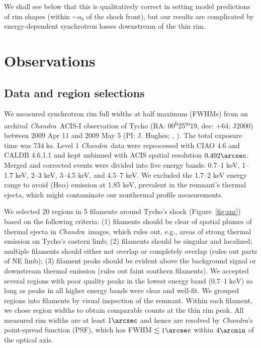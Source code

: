 \documentclass[manuscript]{aastex}  %
\newcommand*{\mt}{\mathrm}
\newcommand*{\unit}[1]{\;\mt{#1}}  %
\newcommand*{\abt}{\mathord{\sim}} %
\newcommand*{\tsup}{\textsuperscript}
\newcommand*{\Chandra}{\textit{Chandra}\ }
\begin{document}
We shall see below that this is qualitatively correct in setting model
predictions of rim shapes (within $\abt a_b$ of the shock front), but our
results are complicated by energy-dependent synchrotron losses downstream of
the thin rim.


\section{Observations}
\label{sec:observations}

\subsection{Data and region selections}
\label{sec:regions}

We measured synchrotron rim full widths at half maximum (FWHMs) from an
archival \Chandra ACIS-I observation of Tycho
(RA: 00\tsup{h}25\tsup{m}19, dec: +64; J2000)
between 2009 Apr 11 and 2009 May 5 (PI: J. Hughes;
,
).
The total exposure time was $734 \unit{ks}$.
Level 1 \Chandra data were reprocessed with CIAO 4.6 and CALDB 4.6.1.1 and kept
unbinned with ACIS spatial resolution $0.492\arcsec$.
Merged and corrected events were divided into five energy bands:
0.7--1 keV, 1--1.7 keV, 2--3 keV, 3--4.5 keV, and 4.5--7 keV.
We excluded the 1.7--2 keV energy range to avoid  (He$\alpha$)
emission at 1.85 keV, prevalent in the remnant's thermal ejecta, which
might contaminate our nonthermal profile measurements.

We selected 20 regions in 5 filaments around Tycho's shock
(Figure~\ref{fig:snr}) based on the following criteria: (1) filaments should be
clear of spatial plumes of thermal ejecta in \Chandra images, which rules out,
e.g., areas of strong thermal emission on Tycho's eastern limb; (2) filaments
should be singular and localized; multiple filaments should either not
overlap or completely overlap (rules out parts of NE limb); (3) filament
peaks should be evident above the background signal or downstream thermal
emission (rules out faint southern filaments).  We accepted several
regions with poor quality peaks in the lowest energy band ($0.7$--$1
\unit{keV}$) so long as peaks in all higher energy bands were clear and
well-fit.  We grouped regions into filaments by visual inspection of the
remnant.  Within each filament, we chose region widths to obtain comparable
counts at the thin rim peak.  All measured rim widths are at least $1\arcsec$
and hence are resolved by \textit{Chandra}'s point-spread function (PSF), which
has FWHM $\lesssim 1\arcsec$ within $4\arcmin$ of the optical axis.
\end{document}
